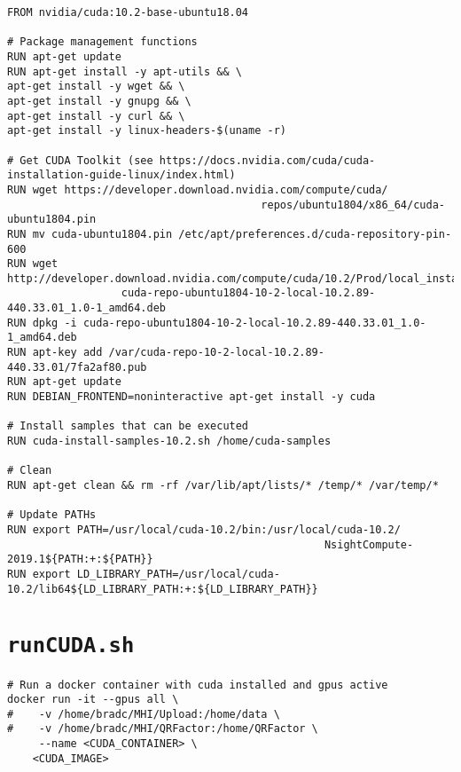 \documentclass[11pt,letterpaper]{article}
\begin{document}
\begin{verbatim}
FROM nvidia/cuda:10.2-base-ubuntu18.04
 
# Package management functions 
RUN apt-get update 
RUN apt-get install -y apt-utils && \
apt-get install -y wget && \
apt-get install -y gnupg && \
apt-get install -y curl && \
apt-get install -y linux-headers-$(uname -r) 

# Get CUDA Toolkit (see https://docs.nvidia.com/cuda/cuda-installation-guide-linux/index.html)
RUN wget https://developer.download.nvidia.com/compute/cuda/
                                        repos/ubuntu1804/x86_64/cuda-ubuntu1804.pin
RUN mv cuda-ubuntu1804.pin /etc/apt/preferences.d/cuda-repository-pin-600 
RUN wget http://developer.download.nvidia.com/compute/cuda/10.2/Prod/local_installers/
                  cuda-repo-ubuntu1804-10-2-local-10.2.89-440.33.01_1.0-1_amd64.deb
RUN dpkg -i cuda-repo-ubuntu1804-10-2-local-10.2.89-440.33.01_1.0-1_amd64.deb 
RUN apt-key add /var/cuda-repo-10-2-local-10.2.89-440.33.01/7fa2af80.pub 
RUN apt-get update 
RUN DEBIAN_FRONTEND=noninteractive apt-get install -y cuda

# Install samples that can be executed
RUN cuda-install-samples-10.2.sh /home/cuda-samples

# Clean
RUN apt-get clean && rm -rf /var/lib/apt/lists/* /temp/* /var/temp/* 

# Update PATHs
RUN export PATH=/usr/local/cuda-10.2/bin:/usr/local/cuda-10.2/
                                                  NsightCompute-2019.1${PATH:+:${PATH}}
RUN export LD_LIBRARY_PATH=/usr/local/cuda-10.2/lib64${LD_LIBRARY_PATH:+:${LD_LIBRARY_PATH}}
\end{verbatim}

\section{\texttt{runCUDA.sh}}
\label{app:runcuda}

\begin{verbatim}
# Run a docker container with cuda installed and gpus active
docker run -it --gpus all \
#    -v /home/bradc/MHI/Upload:/home/data \
#    -v /home/bradc/MHI/QRFactor:/home/QRFactor \
     --name <CUDA_CONTAINER> \
    <CUDA_IMAGE>
\end{verbatim}
\end{document}
